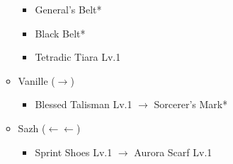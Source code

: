 \begin{menu}
\begin{itemize}
\begin{itemize}
\begin{itemize}
					\item General's Belt*
					\item Black Belt*
					\item Tetradic Tiara Lv.1
				\end{itemize}
			\item Vanille ($\rightarrow$)
				\begin{itemize}
					\item Blessed Talisman Lv.1 $\rightarrow$ Sorcerer's Mark*
				\end{itemize}
			\item Sazh ($\leftarrow\leftarrow$)
				\begin{itemize}
					\item Sprint Shoes Lv.1 $\rightarrow$ Aurora Scarf Lv.1
				\end{itemize}
		\end{itemize}
	\end{itemize}
\end{menu}

\renewcommand{\first}{[1] Mystic Tower (\rav/\sen/\rav)}
\renewcommand{\third}{[3] Protection (\syn/\sen/\med)}
\renewcommand{\fourth}{[4] Entourage (\rav/\sen/\med)}

